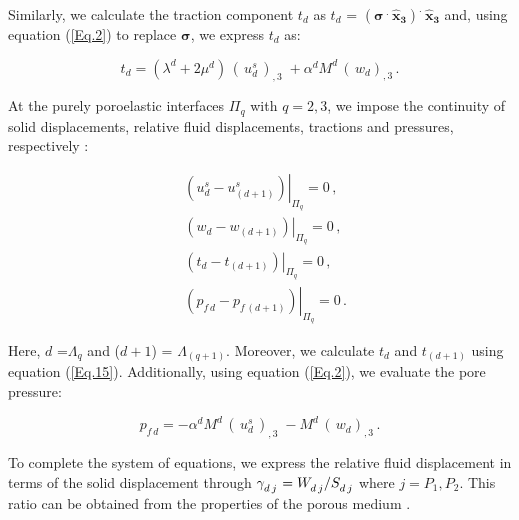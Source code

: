 \documentclass[draft]{agujournal2019}
\begin{document}
Similarly,  we calculate the traction component $t_d$ as $t_d$ = $(\bm{\sigma} \, ^{\bm{.}} \, \bm{\hat x_3}) ^{\bm{.}} \, \bm{\hat x_3}$ and, using equation (\ref{Eq.2}) to replace  $\bm{\sigma}$, we express $t_d$ as:

\begin{linenomath*}
\begin{equation}\label{Eq.15}
t_d =  (\lambda^d + 2 \mu^d)\,  \left( \, u_d ^s \, \right)_{,3}\; + \alpha^d M^d \,  \left( \, w_d \right)_{,3} \,.
\end{equation}
\end{linenomath*}

At the purely poroelastic interfaces $\Pi_q$ with $q=2,3$, we impose the continuity of solid displacements, relative fluid displacements, tractions and pressures, respectively \cite{Deresiewicz1963}:
\begin{linenomath*}
\begin{equation}\label{Eq.16}
\begin{split}
&  \left. \left( u_d^s -  u_{(d+1)}^s \right) \right \rvert_{\Pi_q} = 0 \,, \\
&  \left. \left(  w_d -  w_{(d+1)} \right) \right \rvert_{\Pi_q} = 0 \,, \\
& \left . \left(  t_d  - t_{(d+1)}  \right) \right \rvert_{\Pi_q}= 0 \,,\\
&  \left. \left(  p_{f\,d} -  p_{f\, (d+1)} \right) \right \rvert_{\Pi_q} = 0 \,.
\end{split}
\end{equation}
\end{linenomath*}
Here, $d$ =$\Lambda_q$ and ($d+1$) = $\Lambda_{(q+1)}$. Moreover, we calculate $t_d$ and $t_{(d+1)}$ using equation (\ref{Eq.15}). 
Additionally, using equation (\ref{Eq.2}), we evaluate the pore pressure:
\begin{linenomath*}
\begin{equation}\label{Eq.17}
p_{f \, d} = - \alpha^d M^d\,  \left( \, u_d^{s} \, \right)_{,3}\; - M^d \,  \left( \, w_d \right)_{,3} \, .
\end{equation}
\end{linenomath*}
To complete the system of equations, we express the relative fluid displacement in terms of the solid displacement through
 $\tensor []{\gamma}{_d_{\,j}}=\tensor*[]{W}{_d_{\, j}}/\tensor*[]{S}{_d_{\, j}}$ where $j=P_1, P_2$. This ratio can be  obtained from the properties of the porous medium \cite{Barbosa2016}.
 
\end{document}
